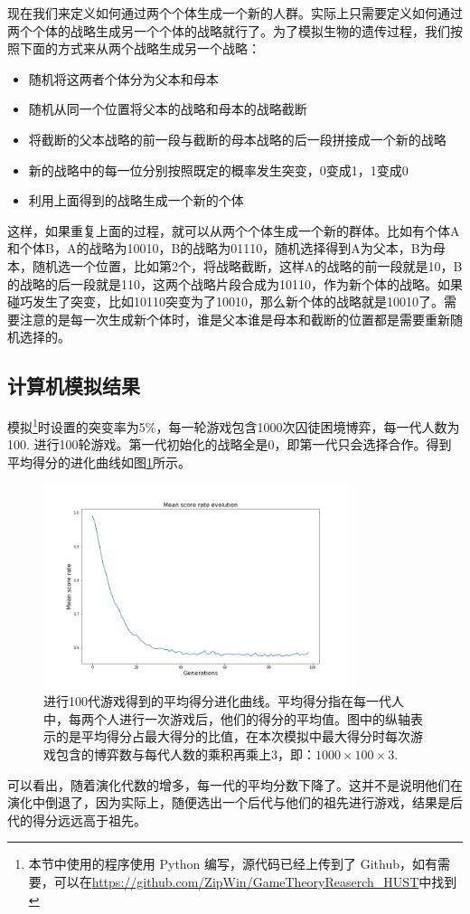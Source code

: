 \documentclass[lang=cn,11pt]{elegantpaper}
\begin{document}
现在我们来定义如何通过两个个体生成一个新的人群。实际上只需要定义如何通过两个个体的战略生成另一个个体的战略就行了。为了模拟生物的遗传过程，我们按照下面的方式来从两个战略生成另一个战略：
\begin{itemize}
	\item 随机将这两者个体分为父本和母本
	\item 随机从同一个位置将父本的战略和母本的战略截断
	\item 将截断的父本战略的前一段与截断的母本战略的后一段拼接成一个新的战略
	\item 新的战略中的每一位分别按照既定的概率发生突变，0变成1，1变成0
	\item 利用上面得到的战略生成一个新的个体
\end{itemize}
这样，如果重复上面的过程，就可以从两个个体生成一个新的群体。比如有个体A和个体B，A的战略为10010，B的战略为01110，随机选择得到A为父本，B为母本，随机选一个位置，比如第2个，将战略截断，这样A的战略的前一段就是10，B的战略的后一段就是110，这两个战略片段合成为10110，作为新个体的战略。如果碰巧发生了突变，比如10110突变为了10010，那么新个体的战略就是10010了。需要注意的是每一次生成新个体时，谁是父本谁是母本和截断的位置都是需要重新随机选择的。
\subsection{计算机模拟结果}
模拟\footnote{本节中使用的程序使用 Python 编写，源代码已经上传到了 Github，如有需要，可以在\url{https://github.com/ZipWin/GameTheoryReaserch\_HUST}中找到}时设置的突变率为5\%，每一轮游戏包含1000次囚徒困境博弈，每一代人数为100. 进行100轮游戏。第一代初始化的战略全是0，即第一代只会选择合作。得到平均得分的进化曲线如图\ref{fig:分数进化曲线}所示。
\begin{figure}[!htb]
	\centering
	\includegraphics[width=0.8\textwidth]{figure/得分率的进化.png}
	\caption{进行100代游戏得到的平均得分进化曲线。平均得分指在每一代人中，每两个人进行一次游戏后，他们的得分的平均值。图中的纵轴表示的是平均得分占最大得分的比值，在本次模拟中最大得分时每次游戏包含的博弈数与每代人数的乘积再乘上3，即：$1000\times100\times3$. \label{fig:分数进化曲线}}
\end{figure}
可以看出，随着演化代数的增多，每一代的平均分数下降了。这并不是说明他们在演化中倒退了，因为实际上，随便选出一个后代与他们的祖先进行游戏，结果是后代的得分远远高于祖先。
\end{document}
